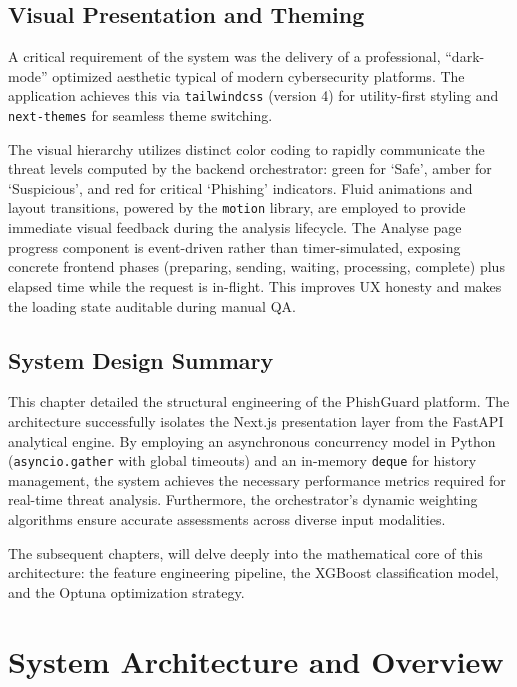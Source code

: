 \subsection{Visual Presentation and
Theming}\label{visual-presentation-and-theming}

A critical requirement of the system was the delivery of a professional,
``dark-mode'' optimized aesthetic typical of modern cybersecurity
platforms. The application achieves this via \texttt{tailwindcss}
(version 4) for utility-first styling and \texttt{next-themes} for
seamless theme switching.

The visual hierarchy utilizes distinct color coding to rapidly
communicate the threat levels computed by the backend orchestrator:
green for `Safe', amber for `Suspicious', and red for critical
`Phishing' indicators. Fluid animations and layout transitions, powered
by the \texttt{motion} library, are employed to provide immediate visual
feedback during the analysis lifecycle. The Analyse page progress
component is event-driven rather than timer-simulated, exposing concrete
frontend phases (preparing, sending, waiting, processing, complete)
plus elapsed time while the request is in-flight. This improves UX
honesty and makes the loading state auditable during manual QA.

\subsection{System Design Summary}\label{summary-1}

This chapter detailed the structural engineering of the PhishGuard
platform. The architecture successfully isolates the Next.js
presentation layer from the FastAPI analytical engine. By employing an
asynchronous concurrency model in Python (\texttt{asyncio.gather} with
global timeouts) and an in-memory \texttt{deque} for history management,
the system achieves the necessary performance metrics required for
real-time threat analysis. Furthermore, the orchestrator's dynamic
weighting algorithms ensure accurate assessments across diverse input
modalities.

The subsequent chapters, will delve deeply into the
mathematical core of this architecture: the feature engineering
pipeline, the XGBoost classification model, and the Optuna optimization
strategy.



\section{System Architecture and
Overview}\label{system-architecture-and-overview}


